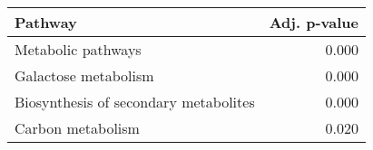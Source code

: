 \begin{tabular}{lr}
\toprule
                               Pathway &  Adj. p-value \\
\midrule
                    Metabolic pathways &         0.000 \\
                  Galactose metabolism &         0.000 \\
 Biosynthesis of secondary metabolites &         0.000 \\
                     Carbon metabolism &         0.020 \\
\bottomrule
\end{tabular}
